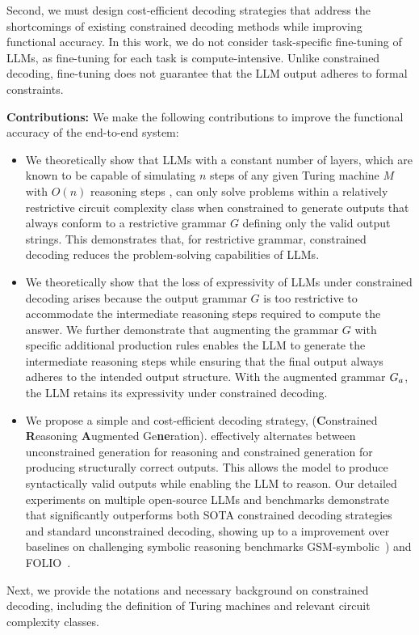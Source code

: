 Second, we must design cost-efficient decoding strategies that address the shortcomings of existing constrained decoding methods while improving functional accuracy. In this work, we do not consider task-specific fine-tuning of LLMs, as fine-tuning for each task is compute-intensive. Unlike constrained decoding, fine-tuning does not guarantee that the LLM output adheres to formal constraints.

\textbf{Contributions: }We make the following contributions to improve the functional accuracy of the end-to-end system:
\begin{itemize}[noitemsep, nolistsep, leftmargin=*]
\item
We theoretically show that LLMs with a constant number of layers, which are known to be capable of simulating \( n \) steps of any given Turing machine \( M \) with \( O(n) \) reasoning steps \cite{expressivity1}, can only solve problems within a relatively restrictive circuit complexity class when constrained to generate outputs that always conform to a restrictive grammar \( G \) defining only the valid output strings. This demonstrates that, for restrictive grammar, constrained decoding reduces the problem-solving capabilities of LLMs.

\item We theoretically show that the loss of expressivity of LLMs under constrained decoding arises because the output grammar $G$ is too restrictive to accommodate the intermediate reasoning steps required to compute the answer. We further demonstrate that augmenting the grammar $G$  with specific additional production rules enables the LLM to generate the intermediate reasoning steps while ensuring that the final output always adheres to the intended output structure. With the augmented grammar $G_a$, the LLM retains its expressivity under constrained decoding.

\item We propose a simple and cost-efficient decoding strategy, \Tool (\textbf{C}onstrained \textbf{R}easoning \textbf{A}ugmented Ge\textbf{ne}ration). 
\Tool effectively alternates between unconstrained generation for reasoning and constrained generation for producing structurally correct outputs. This allows the model to produce syntactically valid outputs while enabling the LLM to reason.
Our detailed experiments on multiple open-source LLMs and benchmarks demonstrate that \Tool{} significantly outperforms both SOTA constrained decoding strategies and standard unconstrained decoding, showing up to a \upto{} improvement over baselines on challenging symbolic reasoning benchmarks GSM-symbolic~\cite{mirzadeh2024gsmsymbolicunderstandinglimitationsmathematical}) and FOLIO~\cite{han2024FOLIOnaturallanguagereasoning}.
\end{itemize}

Next, we provide the notations and necessary background on constrained decoding, including the definition of Turing machines and relevant circuit complexity classes.

